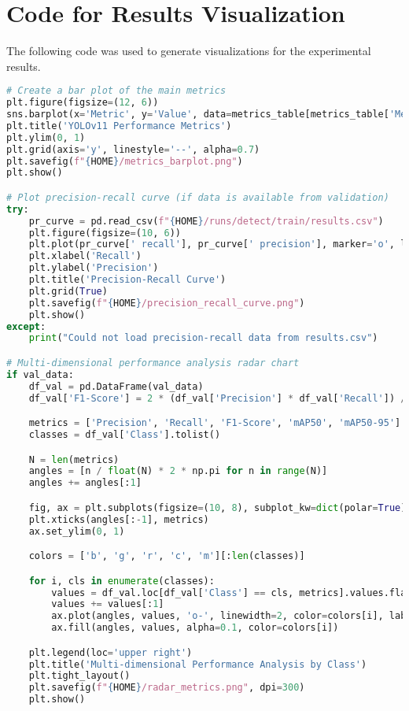 \section{Code for Results Visualization}
\label{appendix:visualization-code}

The following code was used to generate visualizations for the experimental results.

\begin{lstlisting}[language=Python, caption={Results Visualization Code}, label={lst:visualization}]
# Create a bar plot of the main metrics
plt.figure(figsize=(12, 6))
sns.barplot(x='Metric', y='Value', data=metrics_table[metrics_table['Metric'] != 'FPS'])
plt.title('YOLOv11 Performance Metrics')
plt.ylim(0, 1)
plt.grid(axis='y', linestyle='--', alpha=0.7)
plt.savefig(f"{HOME}/metrics_barplot.png")
plt.show()

# Plot precision-recall curve (if data is available from validation)
try:
    pr_curve = pd.read_csv(f"{HOME}/runs/detect/train/results.csv")
    plt.figure(figsize=(10, 6))
    plt.plot(pr_curve[' recall'], pr_curve[' precision'], marker='o', linewidth=2)
    plt.xlabel('Recall')
    plt.ylabel('Precision')
    plt.title('Precision-Recall Curve')
    plt.grid(True)
    plt.savefig(f"{HOME}/precision_recall_curve.png")
    plt.show()
except:
    print("Could not load precision-recall data from results.csv")

# Multi-dimensional performance analysis radar chart
if val_data:
    df_val = pd.DataFrame(val_data)
    df_val['F1-Score'] = 2 * (df_val['Precision'] * df_val['Recall']) / (df_val['Precision'] + df_val['Recall'])

    metrics = ['Precision', 'Recall', 'F1-Score', 'mAP50', 'mAP50-95']
    classes = df_val['Class'].tolist()

    N = len(metrics)
    angles = [n / float(N) * 2 * np.pi for n in range(N)]
    angles += angles[:1]

    fig, ax = plt.subplots(figsize=(10, 8), subplot_kw=dict(polar=True))
    plt.xticks(angles[:-1], metrics)
    ax.set_ylim(0, 1)

    colors = ['b', 'g', 'r', 'c', 'm'][:len(classes)]

    for i, cls in enumerate(classes):
        values = df_val.loc[df_val['Class'] == cls, metrics].values.flatten().tolist()
        values += values[:1]
        ax.plot(angles, values, 'o-', linewidth=2, color=colors[i], label=cls)
        ax.fill(angles, values, alpha=0.1, color=colors[i])

    plt.legend(loc='upper right')
    plt.title('Multi-dimensional Performance Analysis by Class')
    plt.tight_layout()
    plt.savefig(f"{HOME}/radar_metrics.png", dpi=300)
    plt.show()
\end{lstlisting}

